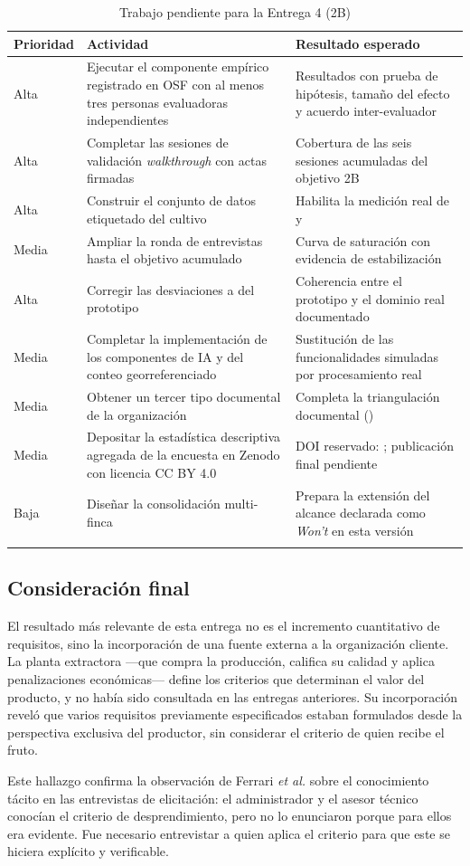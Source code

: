 \begin{longtable}{|C{1.4cm}|L{7.0cm}|L{6.6cm}|}
\hline
{}\textbf{Prioridad} & \textbf{Actividad} & \textbf{Resultado esperado} \\
\hline
\endhead
Alta & Ejecutar el componente empírico registrado en OSF con al menos tres personas evaluadoras independientes & Resultados con prueba de hipótesis, tamaño del efecto y acuerdo inter-evaluador \\ \hline
Alta & Completar las sesiones de validación \emph{walkthrough} con actas firmadas & Cobertura de las seis sesiones acumuladas del objetivo 2B \\ \hline
Alta & Construir el conjunto de datos etiquetado del cultivo & Habilita la medición real de  y  \\ \hline
Media & Ampliar la ronda de entrevistas hasta el objetivo acumulado & Curva de saturación con evidencia de estabilización \\ \hline
Alta & Corregir las desviaciones  a  del prototipo & Coherencia entre el prototipo y el dominio real documentado \\ \hline
Media & Completar la implementación de los componentes de IA y del conteo georreferenciado & Sustitución de las funcionalidades simuladas por procesamiento real \\ \hline
Media & Obtener un tercer tipo documental de la organización & Completa la triangulación documental () \\ \hline
Media & Depositar la estadística descriptiva agregada de la encuesta en Zenodo con licencia CC BY 4.0 & DOI reservado: ; publicación final pendiente \cite{wilkinson2016} \\ \hline
Baja & Diseñar la consolidación multi-finca & Prepara la extensión del alcance declarada como \emph{Won't} en esta versión \\ \hline
\caption{Trabajo pendiente para la Entrega 4 (2B)}
\end{longtable}

\subsection{Consideración final}

El resultado más relevante de esta entrega no es el incremento cuantitativo de requisitos, sino la
incorporación de una fuente externa a la organización cliente. La planta extractora ---que compra la
producción, califica su calidad y aplica penalizaciones económicas--- define los criterios que
determinan el valor del producto, y no había sido consultada en las entregas anteriores. Su
incorporación reveló que varios requisitos previamente especificados estaban formulados desde la
perspectiva exclusiva del productor, sin considerar el criterio de quien recibe el fruto.

Este hallazgo confirma la observación de Ferrari \emph{et al.} \cite{ferrari2016} sobre el
conocimiento tácito en las entrevistas de elicitación: el administrador y el asesor técnico conocían
el criterio de desprendimiento, pero no lo enunciaron porque para ellos era evidente. Fue necesario
entrevistar a quien aplica el criterio para que este se hiciera explícito y verificable.
